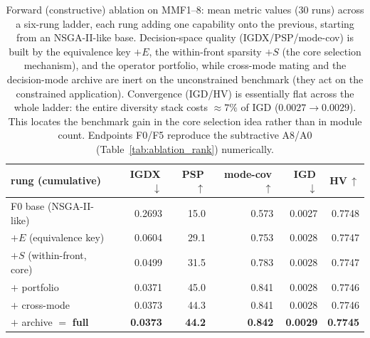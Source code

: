 \begin{table}[t]
\centering\small
\caption{Forward (constructive) ablation on MMF1--8: mean metric values ($30$ runs) across a six-rung ladder, each rung adding one capability onto the previous, starting from an NSGA-II-like base. Decision-space quality (IGDX/PSP/mode-cov) is built by the equivalence key $+E$, the within-front sparsity $+S$ (the core selection mechanism), and the operator portfolio, while cross-mode mating and the decision-mode archive are inert on the unconstrained benchmark (they act on the constrained application). Convergence (IGD/HV) is essentially flat across the whole ladder: the entire diversity stack costs $\approx 7\%$ of IGD ($0.0027\!\to\!0.0029$). This locates the benchmark gain in the core selection idea rather than in module count. Endpoints F0/F5 reproduce the subtractive A8/A0 (Table~\ref{tab:ablation_rank}) numerically.}
\label{tab:forward_ablation}
\begin{tabular}{lrrrrr}
\toprule
rung (cumulative) & IGDX\,$\downarrow$ & PSP\,$\uparrow$ & mode-cov\,$\uparrow$ & IGD\,$\downarrow$ & HV\,$\uparrow$ \\
\midrule
F0 base (NSGA-II-like) & 0.2693 & 15.0 & 0.573 & 0.0027 & 0.7748 \\
\;\;$+E$ (equivalence key) & 0.0604 & 29.1 & 0.753 & 0.0028 & 0.7747 \\
\;\;$+S$ (within-front, core) & 0.0499 & 31.5 & 0.783 & 0.0028 & 0.7747 \\
\;\;$+$ portfolio & 0.0371 & 45.0 & 0.841 & 0.0028 & 0.7746 \\
\;\;$+$ cross-mode & 0.0373 & 44.3 & 0.841 & 0.0028 & 0.7746 \\
\;\;$+$ archive $=$ \textbf{full} & \textbf{0.0373} & \textbf{44.2} & \textbf{0.842} & \textbf{0.0029} & \textbf{0.7745} \\
\bottomrule
\end{tabular}
\end{table}
